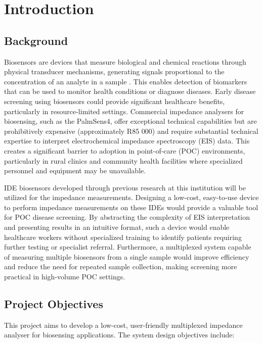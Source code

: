 \graphicspath{{introduction/fig/}}

\chapter{Introduction}
\label{chap:introduction}

\section{Background}

Biosensors are devices that measure biological and chemical reactions through physical transducer mechanisms, generating signals proportional to the concentration of an analyte in a sample \cite{bhallaIntroductionBiosensors2016}. This enables detection of biomarkers that can be used to monitor health conditions or diagnose diseases. Early disease screening using biosensors could provide significant healthcare benefits, particularly in resource-limited settings.
Commercial impedance analysers for biosensing, such as the PalmSens4, offer exceptional technical capabilities but are prohibitively expensive (approximately R85 000) and require substantial technical expertise to interpret electrochemical impedance spectroscopy (EIS) data. This creates a significant barrier to adoption in point-of-care (POC) environments, particularly in rural clinics and community health facilities where specialized personnel and equipment may be unavailable.

\Ac{IDE} biosensors developed through previous research at this institution will be utilized for the impedance measurements. Designing a low-cost, easy-to-use device to perform impedance measurements on these \acp{IDE} would provide a valuable tool for POC disease screening. By abstracting the complexity of EIS interpretation and presenting results in an intuitive format, such a device would enable healthcare workers without specialized training to identify patients requiring further testing or specialist referral. Furthermore, a multiplexed system capable of measuring multiple biosensors from a single sample would improve efficiency and reduce the need for repeated sample collection, making screening more practical in high-volume POC settings.

\section{Project Objectives}

This project aims to develop a low-cost, user-friendly multiplexed impedance analyser for biosensing applications. The system design objectives include:

